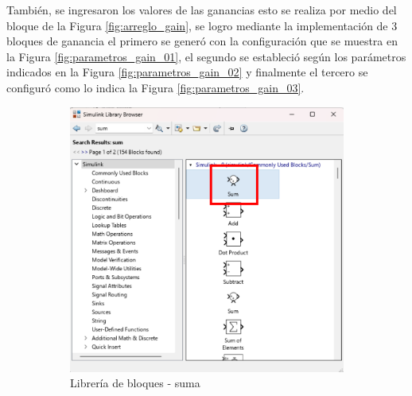 También, se ingresaron los valores de las ganancias esto se realiza por medio del bloque de la Figura \ref{fig:arreglo_gain}, se logro mediante la implementación de 3 bloques de ganancia el primero se generó con la configuración que se muestra en la Figura \ref{fig:parametros_gain_01}, el segundo se estableció según los parámetros indicados en la Figura \ref{fig:parametros_gain_02} y finalmente el tercero se configuró como lo indica la Figura \ref{fig:parametros_gain_03}. 

\begin{figure}[htbp]
    \centering
    \begin{subfigure}[b]{0.35\textwidth}
        \centering
        \includegraphics[width=\textwidth]{fig/Capitulo5/Caso_de_estudio_PID/lib_suma.pdf}
        \caption{Librería de bloques - suma}
        \label{fig:lib_bloques_add}
    \end{subfigure}
    \hfill
    \begin{subfigure}[b]{0.45\textwidth}
        \centering

\end{subfigure}
\end{figure}

